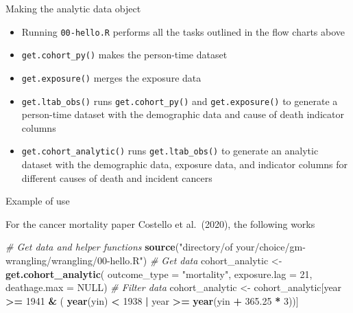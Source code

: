\documentclass[
  ignorenonframetext,
  aspectratio=169,
]{beamer}
\newenvironment{Shaded}{\begin{snugshade}}{\end{snugshade}}
\newcommand{\CommentTok}[1]{\textcolor[rgb]{0.56,0.35,0.01}{\textit{#1}}}
\newcommand{\DataTypeTok}[1]{\textcolor[rgb]{0.13,0.29,0.53}{#1}}
\newcommand{\DecValTok}[1]{\textcolor[rgb]{0.00,0.00,0.81}{#1}}
\newcommand{\FloatTok}[1]{\textcolor[rgb]{0.00,0.00,0.81}{#1}}
\newcommand{\KeywordTok}[1]{\textcolor[rgb]{0.13,0.29,0.53}{\textbf{#1}}}
\newcommand{\NormalTok}[1]{#1}
\newcommand{\OperatorTok}[1]{\textcolor[rgb]{0.81,0.36,0.00}{\textbf{#1}}}
\newcommand{\OtherTok}[1]{\textcolor[rgb]{0.56,0.35,0.01}{#1}}
\newcommand{\StringTok}[1]{\textcolor[rgb]{0.31,0.60,0.02}{#1}}
\providecommand{\tightlist}{%
  \setlength{\itemsep}{0pt}\setlength{\parskip}{0pt}}
\begin{document}
\begin{frame}[fragile]{Making the analytic data object}
\protect\hypertarget{making-the-analytic-data-object}{}

\begin{itemize}
\tightlist
\item
  Running \texttt{00-hello.R} performs all the tasks outlined in the
  flow charts above
\item
  \texttt{get.cohort\_py()} makes the person-time dataset
\item
  \texttt{get.exposure()} merges the exposure data
\item
  \texttt{get.ltab\_obs()} runs \texttt{get.cohort\_py()} and
  \texttt{get.exposure()} to generate a person-time dataset with the
  demographic data and cause of death indicator columns
\item
  \texttt{get.cohort\_analytic()} runs \texttt{get.ltab\_obs()} to
  generate an analytic dataset with the demographic data, exposure data,
  and indicator columns for different causes of death and incident
  cancers
\end{itemize}

\end{frame}

\begin{frame}[fragile]{Example of use}
\protect\hypertarget{example-of-use}{}

For the cancer mortality paper Costello et al.~(2020), the following
works

\begin{Shaded}
\begin{Highlighting}[]
\CommentTok{# Get data and helper functions}
\KeywordTok{source}\NormalTok{(}\StringTok{"directory/of your/choice/gm-wrangling/wrangling/00-hello.R"}\NormalTok{)}
\CommentTok{# Get data}
\NormalTok{cohort_analytic <-}\StringTok{ }\KeywordTok{get.cohort_analytic}\NormalTok{(}
        \DataTypeTok{outcome_type =} \StringTok{"mortality"}\NormalTok{,}
        \DataTypeTok{exposure.lag =} \DecValTok{21}\NormalTok{,}
        \DataTypeTok{deathage.max =} \OtherTok{NULL}\NormalTok{)}
\CommentTok{# Filter data}
\NormalTok{cohort_analytic <-}\StringTok{ }\NormalTok{cohort_analytic[year }\OperatorTok{>=}\StringTok{ }\DecValTok{1941} \OperatorTok{&}\StringTok{ }\NormalTok{(}
        \KeywordTok{year}\NormalTok{(yin) }\OperatorTok{<}\StringTok{ }\DecValTok{1938} \OperatorTok{|}\StringTok{ }\NormalTok{year }\OperatorTok{>=}\StringTok{ }\KeywordTok{year}\NormalTok{(yin }\OperatorTok{+}\StringTok{ }\FloatTok{365.25} \OperatorTok{*}\StringTok{ }\DecValTok{3}\NormalTok{))]}
\end{Highlighting}
\end{Shaded}

\end{frame}
\end{document}
